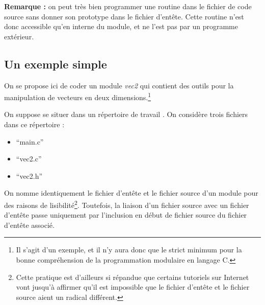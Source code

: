 \documentclass[../../../main.tex]{subfiles}
\begin{document}
\textbf{Remarque :} on peut très bien programmer une routine dans le fichier de code source sans donner son prototype dans le fichier d'entête. Cette routine n'est donc accessible qu'en interne du module, et ne l'est pas par un programme extérieur.
\subsection{Un exemple simple}
\label{sub:un_exemple_simple}
On se propose ici de coder un module \textit{vec2} qui contient des outils pour la manipulation de vecteurs en deux dimensions.\footnote{Il s'agit d'un exemple, et il n'y aura donc que le strict minimum pour la bonne compréhension de la programmation modulaire en langage C.}
 
On suppose se situer dans un répertoire de travail . On considère trois fichiers dans ce répertoire :
\begin{itemize}
	\item ``main.c''
	\item ``vec2.c''
	\item ``vec2.h''
\end{itemize}
On nomme identiquement le fichier d'entête et le fichier source d'un module pour des raisons de lisibilité\footnote{Cette pratique est d'ailleurs si répandue que certains tutoriels sur Internet vont jusqu'à affirmer qu'il est impossible que le fichier d'entête et le fichier source aient un radical différent.}. Toutefois, la liaison d'un fichier source avec un fichier d'entête passe uniquement par l'inclusion en début de fichier source du fichier d'entête associé.
 
\end{document}
